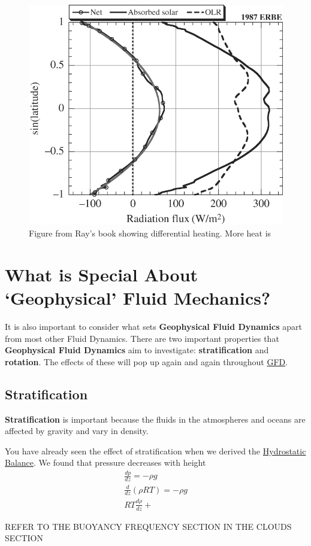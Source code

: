 \begin{figure}[H]
    \centering
    \includegraphics[width=0.5\linewidth]{Figures/GFD/Diff Heating.jpg}
    \caption{Figure from Ray's book showing differential heating. More heat is }
    \label{Diff Heating}
\end{figure}

\section{What is Special About `Geophysical' Fluid Mechanics?}\label{GFD Special}

It is also important to consider what sets \textbf{Geophysical Fluid Dynamics} apart from most other Fluid Dynamics. There are two important properties that \textbf{Geophysical Fluid Dynamics} aim to investigate: \textbf{stratification} and \textbf{rotation}. The effects of these will pop up again and again throughout \hyperref[Geophysical Fluid Dynamics]{GFD}.

\subsection{Stratification}

\textbf{Stratification} is important because the fluids in the atmospheres and oceans are affected by gravity and vary in density. 

You have already seen the effect of stratification when we derived the \hyperref[Hydrostatic Balance]{Hydrostatic Balance}. We found that pressure decreases with height 
\begin{align*}
    \frac{dp}{dz}=-\rho g\\
    \frac{d}{dz}\left( \rho R T \right)=-\rho g\\
    RT \frac{d \rho}{dz} + \frac{}{}
\end{align*}

REFER TO THE BUOYANCY FREQUENCY SECTION IN THE CLOUDS SECTION

